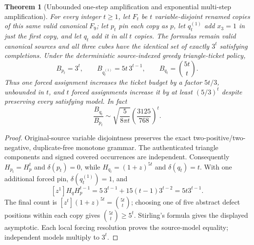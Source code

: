 \documentclass[11pt]{article}
\newtheorem{theorem}{Theorem}
\begin{document}
\begin{theorem}[Unbounded one-step amplification and exponential multi-step amplification]\label{thm:product}
For every integer $t\ge1$, let $F_t$ be $t$ variable-disjoint renamed copies of this same valid canonical $F_9$; let $p_t$ pin each copy as $p$, let $q_t^{(1)}$ add $x_3=1$ in just the first copy, and let $q_t$ add it in all $t$ copies. The formulas remain valid canonical sources and all three cubes have the identical set of exactly $3^t$ satisfying completions. Under the deterministic source-indexed greedy triangle-ticket policy,
\[
\boxed{B_{p_t}=3^t,\qquad
 B_{q_t^{(1)}}=5t\,3^{t-1},\qquad
 B_{q_t}=\binom{5t}{t}.}
\]
Thus one forced assignment increases the ticket budget by a factor $5t/3$, unbounded in $t$, and $t$ forced assignments increase it by at least $(5/3)^t$ despite preserving \emph{every} satisfying model. In fact
\[
\frac{B_{q_t}}{B_{p_t}}\sim
\sqrt{\frac{5}{8\pi t}}\left(\frac{3125}{768}\right)^t.
\]
\end{theorem}
\begin{proof}
Original-source variable disjointness preserves the exact two-positive/two-negative, duplicate-free monotone grammar. The authenticated triangle components and signed covered occurrences are independent. Consequently $H_{p_t}=H_p^t$ and $\delta(p_t)=0$, while $H_{q_t}=(1+z)^{5t}$ and $\delta(q_t)=t$. With one additional forced pin, $\delta(q_t^{(1)})=1$, and
\[
[z^1]H_q H_p^{t-1}
=5\,3^{t-1}+15(t-1)3^{t-2}
=5t3^{t-1}.
\]
The final count is $[z^t](1+z)^{5t}=\binom{5t}{t}$; choosing one of five abstract defect positions within each copy gives $\binom{5t}{t}\ge5^t$. Stirling's formula gives the displayed asymptotic. Each local forcing resolution proves the source-model equality; independent models multiply to $3^t$.
\end{proof}
\end{document}
